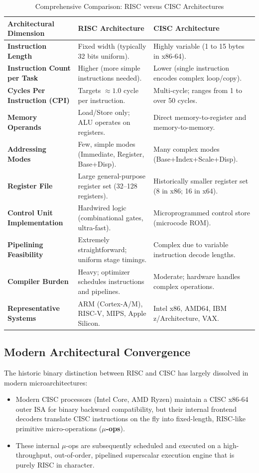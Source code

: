 \begin{table}[htbp]
\centering
\small
\caption{Comprehensive Comparison: RISC versus CISC Architectures}
\label{tab:risc_vs_cisc}
\begin{tabularx}{\textwidth}{l X X}
\toprule
\textbf{Architectural Dimension} & \textbf{RISC Architecture} & \textbf{CISC Architecture} \\
\midrule
\textbf{Instruction Length} & Fixed width (typically 32 bits uniform). & Highly variable (1 to 15 bytes in x86-64). \\
\textbf{Instruction Count per Task} & Higher (more simple instructions needed). & Lower (single instruction encodes complex loop/copy). \\
\textbf{Cycles Per Instruction (CPI)} & Targets $\approx 1.0$ cycle per instruction. & Multi-cycle; ranges from 1 to over 50 cycles. \\
\textbf{Memory Operands} & Load/Store only; ALU operates on registers. & Direct memory-to-register and memory-to-memory. \\
\textbf{Addressing Modes} & Few, simple modes (Immediate, Register, Base+Disp). & Many complex modes (Base+Index+Scale+Disp). \\
\textbf{Register File} & Large general-purpose register set (32--128 registers). & Historically smaller register set (8 in x86; 16 in x64). \\
\textbf{Control Unit Implementation} & Hardwired logic (combinational gates, ultra-fast). & Microprogrammed control store (microcode ROM). \\
\textbf{Pipelining Feasibility} & Extremely straightforward; uniform stage timings. & Complex due to variable instruction decode lengths. \\
\textbf{Compiler Burden} & Heavy; optimizer schedules instructions and pipelines. & Moderate; hardware handles complex operations. \\
\textbf{Representative Systems} & ARM (Cortex-A/M), RISC-V, MIPS, Apple Silicon. & Intel x86, AMD64, IBM z/Architecture, VAX. \\
\bottomrule
\end{tabularx}
\end{table}

\subsection{Modern Architectural Convergence}
The historic binary distinction between RISC and CISC has largely dissolved in modern microarchitectures:
\begin{itemize}
    \item Modern CISC processors (Intel Core, AMD Ryzen) maintain a CISC x86-64 outer ISA for binary backward compatibility, but their internal frontend decoders translate CISC instructions on the fly into fixed-length, RISC-like primitive micro-operations (\textbf{$\mu$-ops}).
    \item These internal $\mu$-ops are subsequently scheduled and executed on a high-throughput, out-of-order, pipelined superscalar execution engine that is purely RISC in character.
\end{itemize}


